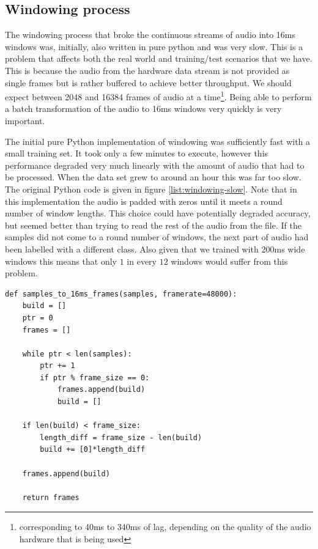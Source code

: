 \documentclass[ %
                    author={Sam Phippen},
                supervisor={Dr. Rafal Bogacz},
                     title={Real time voice activity detectors in noisy personal computing environments},
                  subtitle={},
                    degree={MEng},
                      year={2012} ]{thesis}
\begin{document}
\subsection{Windowing process}

The windowing process that broke the continuous streams of audio into 16ms
windows was, initially, also written in pure python and was very slow. This is
a problem that affects both the real world and training/test scenarios that we
have. This is because the audio from the hardware data stream is not provided
as single frames but is rather buffered to achieve better throughput. We should
expect between 2048 and 16384 frames of audio at a time\footnote{corresponding
    to 40ms to 340ms of lag, depending on the quality of the audio
hardware that is being used}. Being able to perform a batch transformation of
the audio to 16ms windows very quickly is very important.

The initial pure Python implementation of windowing was sufficiently fast with
a small training set. It took only a few minutes to execute, however this
performance degraded very much linearly with the amount of audio that had to be
processed. When the data set grew to around an hour this was far too slow. The
original Python code is given in figure \ref{list:windowing-slow}. Note that in
this implementation the audio is padded with zeros until it meets a round
number of window lengths. This choice could have potentially degraded accuracy,
but seemed better than trying to read the rest of the audio from the file. If
the samples did not come to a round number of windows, the next part of audio
had been labelled with a different class. Also given that we trained with 200ms
wide windows this means that only $1$ in every $12$ windows would suffer from
this problem.


\begin{lstlisting}[frame=single,caption=Original slow windowing implementation, label=list:windowing-slow]
def samples_to_16ms_frames(samples, framerate=48000):
    build = []
    ptr = 0
    frames = []

    while ptr < len(samples):
        ptr += 1
        if ptr % frame_size == 0:
            frames.append(build)
            build = []

    if len(build) < frame_size:
        length_diff = frame_size - len(build)
        build += [0]*length_diff

    frames.append(build)

    return frames

\end{lstlisting}
\end{document}
